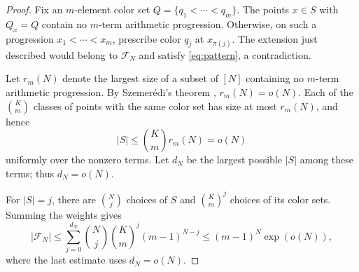\documentclass[10pt,a4paper]{amsart}
\numberwithin{equation}{section}
\newcommand{\calF}{\mathcal F}
\begin{document}
\begin{proof}
Fix an $m$-element color set $Q=\{q_1<\cdots<q_m\}$. The points $x\in S$ with $Q_x=Q$ contain no $m$-term arithmetic progression. Otherwise, on such a progression $x_1<\cdots<x_m$, prescribe color $q_j$ at $x_{\pi(j)}$. The extension just described would belong to $\calF_N$ and satisfy \eqref{eq:pattern}, a contradiction.

Let $r_m(N)$ denote the largest size of a subset of $[N]$ containing no $m$-term arithmetic progression. By Szemer\'edi's theorem \cite{Szemeredi}, $r_m(N)=o(N)$. Each of the $\binom Km$ classes of points with the same color set has size at most $r_m(N)$, and hence
\[
 |S|\leq\binom Km r_m(N)=o(N)
\]
uniformly over the nonzero terms. Let $d_N$ be the largest possible $|S|$ among these terms; thus $d_N=o(N)$.

For $|S|=j$, there are $\binom Nj$ choices of $S$ and $\binom{K}{m}^{j}$ choices of its color sets. Summing the weights gives
\[
 |\calF_N|\leq\sum_{j=0}^{d_N}\binom Nj\binom{K}{m}^{j}(m-1)^{N-j}
 \leq(m-1)^N\exp(o(N)),
\]
where the last estimate uses $d_N=o(N)$.
\end{proof}
\end{document}

